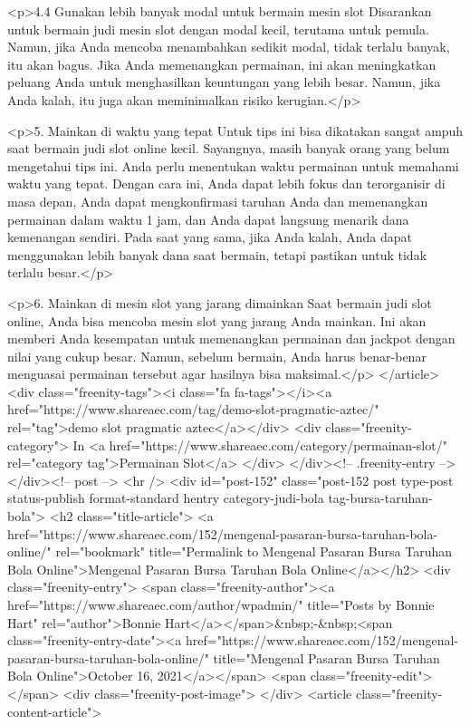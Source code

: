 {<p>4.4 Gunakan lebih banyak modal untuk bermain mesin slot Disarankan untuk bermain judi mesin slot dengan modal kecil, terutama untuk pemula. Namun, jika Anda mencoba menambahkan sedikit modal, tidak terlalu banyak, itu akan bagus. Jika Anda memenangkan permainan, ini akan meningkatkan peluang Anda untuk menghasilkan keuntungan yang lebih besar. Namun, jika Anda kalah, itu juga akan meminimalkan risiko kerugian.</p>



<p>5. Mainkan di waktu yang tepat Untuk tips ini bisa dikatakan sangat ampuh saat bermain judi slot online kecil. Sayangnya, masih banyak orang yang belum mengetahui tips ini. Anda perlu menentukan waktu permainan untuk memahami waktu yang tepat. Dengan cara ini, Anda dapat lebih fokus dan terorganisir di masa depan, Anda dapat mengkonfirmasi taruhan Anda dan memenangkan permainan dalam waktu 1 jam, dan Anda dapat langsung menarik dana kemenangan sendiri. Pada saat yang sama, jika Anda kalah, Anda dapat menggunakan lebih banyak dana saat bermain, tetapi pastikan untuk tidak terlalu besar.</p>



<p>6. Mainkan di mesin slot yang jarang dimainkan Saat bermain judi slot online, Anda bisa mencoba mesin slot yang jarang Anda mainkan. Ini akan memberi Anda kesempatan untuk memenangkan permainan dan jackpot dengan nilai yang cukup besar. Namun, sebelum bermain, Anda harus benar-benar menguasai permainan tersebut agar hasilnya bisa maksimal.</p>
									</article>
																			<div class="freenity-tags"><i class="fa fa-tags"></i><a href="https://www.shareaec.com/tag/demo-slot-pragmatic-aztec/" rel="tag">demo slot pragmatic aztec</a></div>
																			<div class="freenity-category">
											In <a href="https://www.shareaec.com/category/permainan-slot/" rel="category tag">Permainan Slot</a>										</div>
																	</div><!-- .freenity-entry -->
							</div><!-- post -->
							<hr />
													<div id="post-152" class="post-152 post type-post status-publish format-standard hentry category-judi-bola tag-bursa-taruhan-bola">
								<h2 class="title-article">
									<a href="https://www.shareaec.com/152/mengenal-pasaran-bursa-taruhan-bola-online/" rel="bookmark" title="Permalink to Mengenal Pasaran Bursa Taruhan Bola Online">Mengenal Pasaran Bursa Taruhan Bola Online</a></h2>
								<div class="freenity-entry">
									<span class="freenity-author"><a href="https://www.shareaec.com/author/wpadmin/" title="Posts by Bonnie Hart" rel="author">Bonnie Hart</a></span>&nbsp;-&nbsp;<span class="freenity-entry-date"><a href="https://www.shareaec.com/152/mengenal-pasaran-bursa-taruhan-bola-online/" title="Mengenal Pasaran Bursa Taruhan Bola Online">October 16, 2021</a></span>
									<span class="freenity-edit"> </span>
									<div class="freenity-post-image">  </div>
																		<article class="freenity-content-article">
										
}
